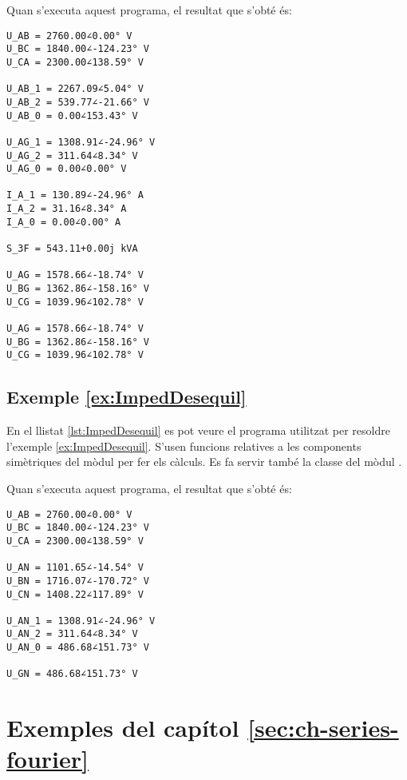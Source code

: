 Quan s'executa aquest programa, el resultat que s'obté és:
\lstset{
	language=,
	numbers=none,
	frame=none
}
\begin{lstlisting}
U_AB = 2760.00∠0.00° V
U_BC = 1840.00∠-124.23° V
U_CA = 2300.00∠138.59° V

U_AB_1 = 2267.09∠5.04° V
U_AB_2 = 539.77∠-21.66° V
U_AB_0 = 0.00∠153.43° V

U_AG_1 = 1308.91∠-24.96° V
U_AG_2 = 311.64∠8.34° V
U_AG_0 = 0.00∠0.00° V

I_A_1 = 130.89∠-24.96° A
I_A_2 = 31.16∠8.34° A
I_A_0 = 0.00∠0.00° A

S_3F = 543.11+0.00j kVA

U_AG = 1578.66∠-18.74° V
U_BG = 1362.86∠-158.16° V
U_CG = 1039.96∠102.78° V

U_AG = 1578.66∠-18.74° V
U_BG = 1362.86∠-158.16° V
U_CG = 1039.96∠102.78° V
\end{lstlisting}


\hypertarget{exemple:ImpedDesequil}{\subsection{Exemple \ref*{ex:ImpedDesequil} \ImpedDesequil}}
En el llistat \vref{lst:ImpedDesequil} es pot veure el programa utilitzat per resoldre l'exemple \vref{ex:ImpedDesequil}. S'usen funcions relatives a les components simètriques del mòdul  per fer els càlculs. Es fa servir també la classe  del mòdul .


Quan s'executa aquest programa, el resultat que s'obté és:
\lstset{
	language=,
	numbers=none,
	frame=none
}
\begin{lstlisting}
U_AB = 2760.00∠0.00° V
U_BC = 1840.00∠-124.23° V
U_CA = 2300.00∠138.59° V

U_AN = 1101.65∠-14.54° V
U_BN = 1716.07∠-170.72° V
U_CN = 1408.22∠117.89° V

U_AN_1 = 1308.91∠-24.96° V
U_AN_2 = 311.64∠8.34° V
U_AN_0 = 486.68∠151.73° V

U_GN = 486.68∠151.73° V
\end{lstlisting}




\section{Exemples del capítol \ref*{sec:ch-series-fourier}}

